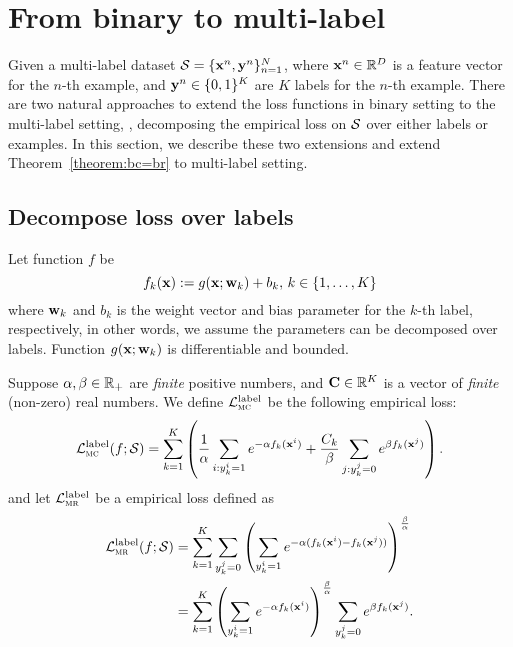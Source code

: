 \section{From binary to multi-label}
\label{sec:ml}

Given a multi-label dataset $\mathcal{S} = \{\mathbf{x}^n, \mathbf{y}^n\}_{n=1}^N$, where $\mathbf{x}^n \in \mathbb{R}^D$ is a feature vector for the $n$-th example,
and $\mathbf{y}^n \in \{0,1\}^K$ are $K$ labels for the $n$-th example.
There are two natural approaches to extend the loss functions in binary setting to the multi-label setting, 
\ie, decomposing the empirical loss on $\mathcal{S}$ over either labels or examples.
In this section, we describe these two extensions and extend Theorem~\ref{theorem:bc=br} to multi-label setting.


\subsection{Decompose loss over labels}

Let function $f$ be
\begin{equation*}
f_k(\mathbf{x}) := g(\mathbf{x}; \mathbf{w}_k) + b_k, \, k \in \{1,\dots,K\}
\end{equation*}
where $\mathbf{w}_k$ and $b_k$ is the weight vector and bias parameter for the $k$-th label, respectively,
in other words, we assume the parameters can be decomposed over labels.
Function $g(\mathbf{x}; \mathbf{w}_k)$ is differentiable and bounded.

Suppose $\alpha, \beta \in \mathbb{R}_+$ are \emph{finite} positive numbers, 
and $\mathbf{C} \in \mathbb{R}^K$ is a vector of \emph{finite} (non-zero) real numbers.
We define $\mathcal{L}_\textsc{mc}^\text{label}$ be the following empirical loss:
\begin{equation}
\label{eq:mc1}
\displaystyle
\mathcal{L}_\textsc{mc}^\text{label}(f; \mathcal{S})
= \sum_{k=1}^K \left(
  \frac{1}{\alpha} \sum_{i: y_k^i = 1} e^{-\alpha f_k(\mathbf{x}^i)} +
  \frac{C_k}{\beta} \sum_{j: y_k^j = 0} e^{\beta  f_k(\mathbf{x}^j)} \right).
\end{equation}
and let $\mathcal{L}_\textsc{mr}^\text{label}$ be a empirical loss defined as
\begin{equation}
\label{eq:mr1}
\begin{aligned}
\displaystyle
\mathcal{L}_\textsc{mr}^\text{label}(f; \mathcal{S})
&= \sum_{k=1}^K
   \sum_{y_k^j = 0} \left( \sum_{y_k^i = 1} e^{-\alpha(f_k(\mathbf{x}^i) - f_k(\mathbf{x}^j))} \right)^\frac{\beta}{\alpha} \\
&= \sum_{k=1}^K \left( 
   \sum_{y_k^i = 1} e^{-\alpha f_k(\mathbf{x}^i)} \right)^\frac{\beta}{\alpha} 
   \sum_{y_k^j = 0} e^{ \beta  f_k(\mathbf{x}^j)}.
\end{aligned}
\end{equation}



